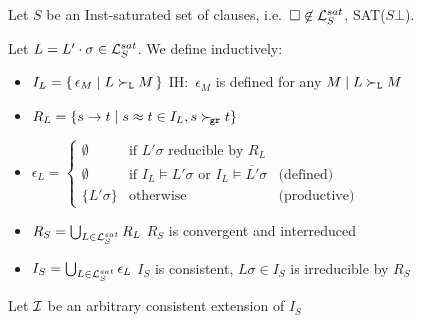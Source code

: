     \begin{definition}\label{def:candidate:model:construction}

        Let $S$ be an Inst-saturated set of clauses,
        i.e.~$\square\not\in\mathcal{L}_S^{sat}$, SAT($S\bot$).

        Let $L = L'\cdot\sigma \in\mathcal{L}_S^{sat}$.
        We define inductively:

            \begin{itemize}
                \item $I_L = \{\,\epsilon_M\mid L\mathrel\succ_{\mathtt{L}} M\,\}$
                \hfill  IH:~$\epsilon_M$ is defined for any $M\mid L\mathrel\succ_{\mathtt{L}} M$

                \item $R_L = \{ s \to t \mid s\approx t\in I_L, s\mathrel\succ_{\!\mathtt{gr}} t \}$

                    \item $\epsilon_L = \left\{
                        \begin{array}{cll}
                            \emptyset &\text{if }
                            L'\sigma\text{ reducible by }R_L
                            \\
                            \emptyset &\text{if }
                            I_L\vDash L'\sigma
                            \text{ or }
                            I_L\vDash \overline{L'}\sigma
                            &\text{(defined)}
                            \\
                            \{ L'\sigma \}
                            &\text{otherwise}
                            &\text{(productive)}
                        \end{array}
                    \right.$

                \item
                $R_S = \bigcup_{L\in\mathcal{L}_S^{sat}} R_L$
                \hfill
                $R_S$ is convergent and interreduced

                \item
                $I_S = \bigcup_{L\in\mathcal{L}_S^{sat}} \epsilon_L$
                \hfill
                $I_S$ is consistent,
                $L\sigma\in I_S$ is irreducible by $R_S$
            \end{itemize}
        \end{definition}

            Let $\mathcal{I}$ be an arbitrary consistent extension of $I_S$


